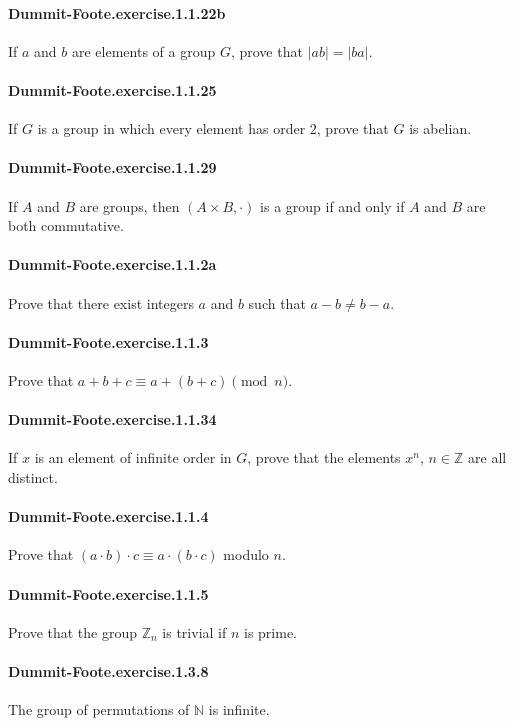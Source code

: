 \documentclass{article}
\begin{document}
\paragraph{Dummit-Foote.exercise.1.1.22b} If $a$ and $b$ are elements of a group $G$, prove that $|ab|=|ba|$.

\paragraph{Dummit-Foote.exercise.1.1.25} If $G$ is a group in which every element has order $2$, prove that $G$ is abelian.

\paragraph{Dummit-Foote.exercise.1.1.29} If $A$ and $B$ are groups, then $(A\times B, \cdot)$ is a group if and only if $A$ and $B$ are both commutative.

\paragraph{Dummit-Foote.exercise.1.1.2a} Prove that there exist integers $a$ and $b$ such that $a-b\neq b-a$.

\paragraph{Dummit-Foote.exercise.1.1.3} Prove that $a+b+c\equiv a+(b+c)\pmod{n}$.

\paragraph{Dummit-Foote.exercise.1.1.34} If $x$ is an element of infinite order in $G$, prove that the elements $x^n$, $n\in\mathbb{Z}$ are all distinct.

\paragraph{Dummit-Foote.exercise.1.1.4} Prove that $(a\cdot b)\cdot c \equiv a\cdot (b\cdot c)$ modulo $n$.

\paragraph{Dummit-Foote.exercise.1.1.5} Prove that the group $\mathbb{Z}_n$ is trivial if $n$ is prime.

\paragraph{Dummit-Foote.exercise.1.3.8} The group of permutations of $\mathbb{N}$ is infinite.
\end{document}
